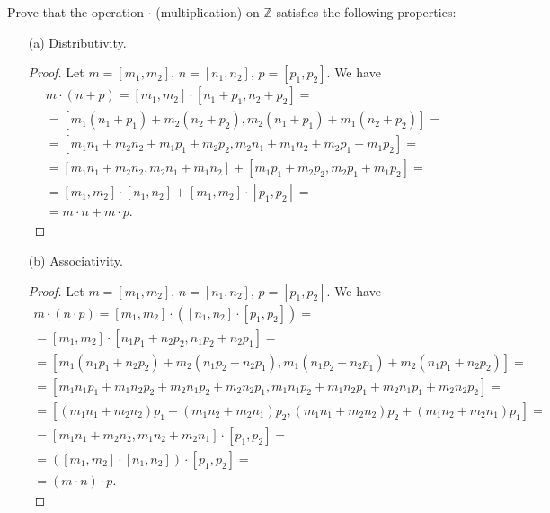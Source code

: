 \begin{problem}
    Prove that the operation $\cdot$ (multiplication) on $\mathbb{Z}$ satisfies the following properties:
    \begin{enumerate}
        \item[(a)] Distributivity.
            \begin{proof}
                Let $m = [m_1, m_2]$, $n = [n_1, n_2]$, $p = [p_1, p_2]$. We have
                \begin{gather*}
                    m \cdot (n + p) = [m_1, m_2] \cdot [n_1 + p_1, n_2 + p_2] =\\=
                    [m_1(n_1+p_1)+m_2(n_2+p_2), m_2(n_1+p_1)+m_1(n_2+p_2)] =\\=
                    [m_1n_1+m_2n_2+m_1p_1+m_2p_2, m_2n_1+m_1n_2+m_2p_1+m_1p_2] =\\=
                    [m_1n_1+m_2n_2, m_2n_1+m_1n_2] + [m_1p_1+m_2p_2, m_2p_1+m_1p_2] =\\=
                    [m_1, m_2] \cdot [n_1, n_2] + [m_1, m_2] \cdot [p_1, p_2] =\\=
                    m \cdot n + m \cdot p.
                \end{gather*}
            \end{proof}

        \item[(b)] Associativity.
            \begin{proof}
                Let $m = [m_1, m_2]$, $n = [n_1, n_2]$, $p = [p_1, p_2]$. We have
                \begin{gather*}
                    m \cdot (n \cdot p) = [m_1,m_2] \cdot ([n_1,n_2] \cdot [p_1,p_2]) =\\=
                    [m_1,m_2] \cdot [n_1p_1+n_2p_2, n_1p_2+n_2p_1] =\\=
                    [m_1(n_1p_1+n_2p_2)+m_2(n_1p_2+n_2p_1), m_1(n_1p_2+n_2p_1)+m_2(n_1p_1+n_2p_2)] =\\=
                    [m_1n_1p_1+m_1n_2p_2+m_2n_1p_2+m_2n_2p_1, m_1n_1p_2+m_1n_2p_1+m_2n_1p_1+m_2n_2p_2] =\\=
                    [(m_1n_1+m_2n_2)p_1+(m_1n_2+m_2n_1)p_2, (m_1n_1+m_2n_2)p_2+(m_1n_2+m_2n_1)p_1] =\\=
                    [m_1n_1+m_2n_2, m_1n_2+m_2n_1] \cdot [p_1,p_2] =\\=
                    ([m_1,m_2] \cdot [n_1,n_2]) \cdot [p_1,p_2] =\\=
                    (m \cdot n) \cdot p.
                \end{gather*}
            \end{proof}


\end{enumerate}
\end{problem}
